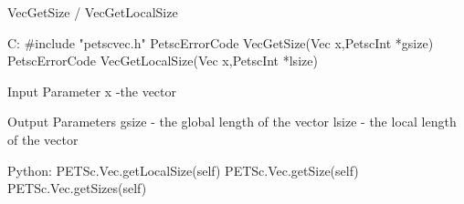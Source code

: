 VecGetSize / VecGetLocalSize

C:
#include "petscvec.h"
PetscErrorCode  VecGetSize(Vec x,PetscInt *gsize)
PetscErrorCode  VecGetLocalSize(Vec x,PetscInt *lsize)

Input Parameter
x -the vector

Output Parameters
gsize - the global length of the vector
lsize - the local length of the vector

Python:
PETSc.Vec.getLocalSize(self)
PETSc.Vec.getSize(self)
PETSc.Vec.getSizes(self)
